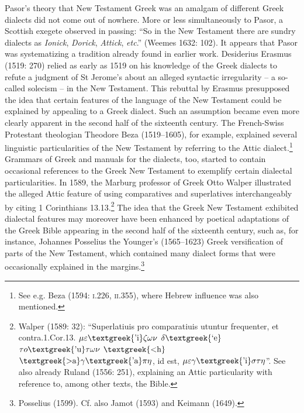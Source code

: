 \documentclass[12pt]{article}
\newenvironment{styleStandard}{\renewcommand\baselinestretch{1.25}\setlength\leftskip{0in}\setlength\rightskip{0in}\setlength\parindent{0.1972in}\setlength\parfillskip{0pt plus 1fil}\setlength\parskip{0in plus 1pt}\writerlistparindent\writerlistleftskip\leavevmode\normalfont\normalsize\writerlistlabel\ignorespaces}{\unskip\vspace{0in plus 1pt}\par}
\newcommand\writerlistleftskip{}
\newcommand\writerlistparindent{}
\newcommand\writerlistlabel{}
\begin{document}
\begin{styleStandard}
\end{styleStandard}

\begin{styleStandard}
Pasor’s theory that New Testament Greek was an amalgam of different Greek dialects did not come out of nowhere. More or less simultaneously to Pasor, a Scottish exegete observed in passing: “So in the New Testament there are sundry dialects as \textit{Ionick}, \textit{Dorick},\textit{ Attick}, \textit{etc}.” (Weemes 1632: 102). It appears that Pasor was systematizing a tradition already found in earlier work. Desiderius Erasmus (1519: 270) relied as early as 1519 on his knowledge of the Greek dialects to refute a judgment of St Jerome’s about an alleged syntactic irregularity – a so-called solecism – in the New Testament. This rebuttal by Erasmus presupposed the idea that certain features of the language of the New Testament could be explained by appealing to a Greek dialect. Such an assumption became even more clearly apparent in the second half of the sixteenth century. The French-Swiss Protestant theologian Theodore Beza (1519–1605), for example, explained several linguistic particularities of the New Testament by referring to the Attic dialect.\footnote{ See e.g. Beza (1594: \textsc{i.}226, \textsc{ii}.355), where Hebrew influence was also mentioned.} Grammars of Greek and manuals for the dialects, too, started to contain occasional references to the Greek New Testament to exemplify certain dialectal particularities. In 1589, the Marburg professor of Greek Otto Walper illustrated the alleged Attic feature of using comparatives and superlatives interchangeably by citing 1 Corinthians 13.13.\footnote{ Walper (1589: 32): “Superlatiuis pro comparatiuis utuntur frequenter, et contra.1.Cor.13. $\mu \varepsilon \text{\textgreek{'i}}\zeta \omega \nu $ $\delta \text{\textgreek{`e}}$ $\tau o\text{\textgreek{'u}}\tau \omega \nu $ $\text{\textgreek{<h}}$ $\text{\textgreek{>a}}\gamma \text{\textgreek{'a}}\pi \eta $, id est, $\mu \varepsilon \gamma \text{\textgreek{'i}}\sigma \tau \eta $”. See also already Ruland (1556: 251), explaining an Attic particularity with reference to, among other texts, the Bible.} The idea that the Greek New Testament exhibited dialectal features may moreover have been enhanced by poetical adaptations of the Greek Bible appearing in the second half of the sixteenth century, such as, for instance, Johannes Posselius the Younger’s (1565–1623) Greek versification of parts of the New Testament, which contained many dialect forms that were occasionally explained in the margins.\footnote{ Posselius (1599). Cf. also Jamot (1593) and Keimann (1649).}
\end{styleStandard}
\end{document}
